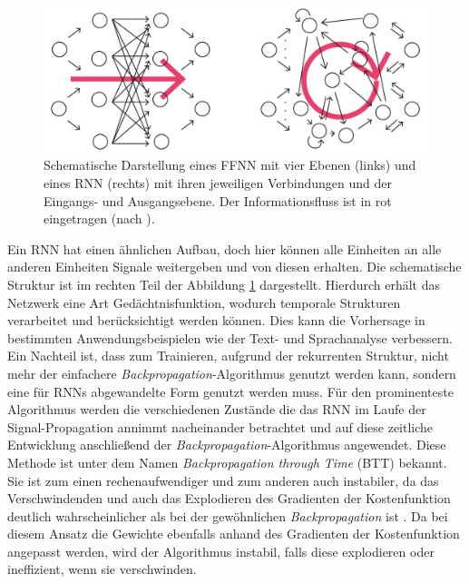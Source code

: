 \begin{figure}[H]
    \centering
    \includegraphics[width = 0.9 \textwidth]{figures/illustrations/ffnn_rnn_structure.pdf}
    \caption{Schematische Darstellung eines \textsc{FFNN} mit vier Ebenen (links) und eines \textsc{RNN} (rechts) mit ihren jeweiligen Verbindungen und der Eingangs- und Ausgangsebene. Der Informationsfluss ist in rot eingetragen (nach \citep{jeagerTut2002}).}
    \label{fig:ffnn_rnn_structure}
\end{figure}

Ein \textsc{RNN} hat einen ähnlichen Aufbau, doch hier können alle Einheiten an alle anderen Einheiten Signale weitergeben und von diesen erhalten. Die schematische Struktur ist im rechten Teil der Abbildung \ref{fig:ffnn_rnn_structure} dargestellt. Hierdurch erhält das Netzwerk eine Art Gedächtnisfunktion, wodurch temporale Strukturen verarbeitet und berücksichtigt werden können. Dies kann die Vorhersage in bestimmten Anwendungsbeispielen wie der Text- und Sprachanalyse verbessern.\\
Ein Nachteil ist, dass zum Trainieren, aufgrund der rekurrenten Struktur, nicht mehr der einfachere \textit{Backpropagation}-Algorithmus genutzt werden kann, sondern eine für \textsc{RNN}s abgewandelte Form genutzt werden muss. Für den prominenteste Algorithmus werden die verschiedenen Zustände die das \textsc{RNN} im Laufe der Signal-Propagation annimmt nacheinander betrachtet und auf diese zeitliche Entwicklung anschließend der \textit{Backpropagation}-Algorithmus angewendet. Diese Methode ist unter dem Namen \textit{Backpropagation through Time} (BTT) bekannt. Sie ist zum einen rechenaufwendiger und zum anderen auch instabiler, da das Verschwindenden und auch das Explodieren des Gradienten der Kostenfunktion deutlich wahrscheinlicher als bei der gewöhnlichen \textit{Backpropagation} ist \citep{pascanu, jeagerTut2002}. Da bei diesem Ansatz die Gewichte ebenfalls anhand des Gradienten der Kostenfunktion angepasst werden, wird der Algorithmus instabil, falls diese explodieren oder ineffizient, wenn sie verschwinden.
